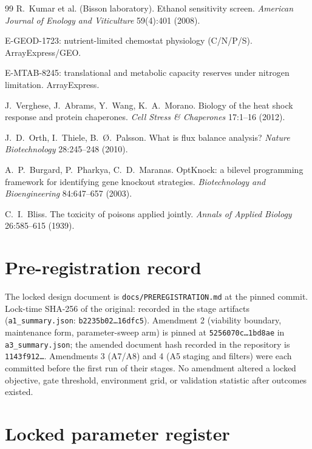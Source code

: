 \documentclass[12pt]{article}
\begin{document}
\begin{thebibliography}{99}
 R.\ Kumar et al. (Bisson laboratory). Ethanol
sensitivity screen. \emph{American Journal of Enology and Viticulture}
59(4):401 (2008).

 E-GEOD-1723: nutrient-limited chemostat physiology
(C/N/P/S). ArrayExpress/GEO.

 E-MTAB-8245: translational and metabolic capacity
reserves under nitrogen limitation. ArrayExpress.

 J.\ Verghese, J.\ Abrams, Y.\ Wang, K.\ A.\ Morano.
Biology of the heat shock response and protein chaperones.
\emph{Cell Stress \& Chaperones} 17:1--16 (2012).

 J.\ D.\ Orth, I.\ Thiele, B.\ \O.\ Palsson. What is flux
balance analysis? \emph{Nature Biotechnology} 28:245--248 (2010).

 A.\ P.\ Burgard, P.\ Pharkya, C.\ D.\ Maranas.
OptKnock: a bilevel programming framework for identifying gene
knockout strategies. \emph{Biotechnology and Bioengineering}
84:647--657 (2003).

 C.\ I.\ Bliss. The toxicity of poisons applied jointly.
\emph{Annals of Applied Biology} 26:585--615 (1939).

\end{thebibliography}
\appendix

\section{Pre-registration record}
\label{app:prereg}

The locked design document is \texttt{docs/PREREGISTRATION.md} at the
pinned commit. Lock-time SHA-256 of the original:
recorded in the stage artifacts (\texttt{a1\_summary.json}:
\texttt{b2235b02\ldots16dfc5}). Amendment 2 (viability boundary,
maintenance form, parameter-sweep arm) is pinned at
\texttt{5256070c\ldots1bd8ae} in \texttt{a3\_summary.json}; the
amended document hash recorded in the repository is
\texttt{1143f912\ldots}. Amendments 3 (A7/A8) and 4 (A5 staging and
filters) were each committed before the first run of their stages.
No amendment altered a locked objective, gate threshold, environment
grid, or validation statistic after outcomes existed.

\section{Locked parameter register}
\label{app:params}
\end{document}

